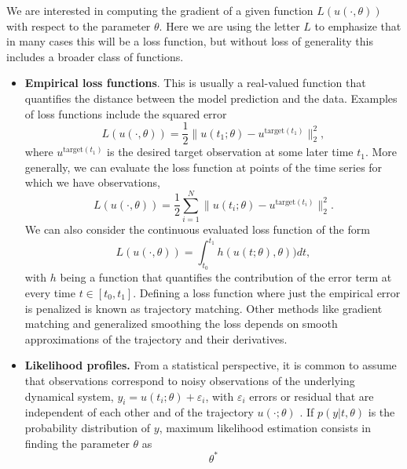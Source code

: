 We are interested in computing the gradient of a given function $L(u(\cdot, \theta))$ with respect to the parameter $\theta$.
Here we are using the letter $L$ to emphasize that in many cases this will be a loss function, but without loss of generality this includes a broader class of functions. 
\begin{itemize}
    \item \textbf{Empirical loss functions}. This is usually a real-valued function that quantifies the distance between the model prediction and the data. Examples of loss functions include the squared error
    \begin{equation}
         L(u(\cdot, \theta)) = \frac{1}{2} \| u(t_1; \theta) - u^{\text{target}(t_1)} \|_2^2,
         \label{eq:quadratic-loss-function}
    \end{equation}
    where $u^{\text{target}(t_1)}$ is the desired target observation at some later time $t_1$.
    More generally, we can evaluate the loss function at points of the time series for which we have observations, 
    \begin{equation}
        L(u(\cdot, \theta)) = \frac{1}{2} \sum_{i=1}^N \| u(t_i; \theta) - u^{\text{target}(t_i)} \|_2^2.
    \end{equation}
    We can also consider the continuous evaluated loss function of the form
    \begin{equation}
         L(u(\cdot, \theta)) = \int_{t_0}^{t_1} h( u(t;\theta), \theta) ) dt, 
    \end{equation}
    with $h$ being a function that quantifies the contribution of the error term at every time $t \in [t_0, t_1]$. 
    Defining a loss function where just the empirical error is penalized is known as trajectory matching. 
    Other methods like gradient matching and generalized smoothing the loss depends on smooth approximations of the trajectory and their derivatives. 
    \item \textbf{Likelihood profiles.} From a statistical perspective, it is common to assume that observations correspond to noisy observations of the underlying dynamical system, $y_i = u(t_i; \theta) + \varepsilon_i$, with $\varepsilon_i$ errors or residual that are independent of each other and of the trajectory $u(\cdot ; \theta)$ \cite{ramsay2017dynamic}.
    If $p(y | t , \theta)$ is the probability distribution of $y$, maximum likelihood estimation consists in finding the parameter $\theta$ as
    \begin{equation}
        \theta^* 

\end{equation}
\end{itemize}
